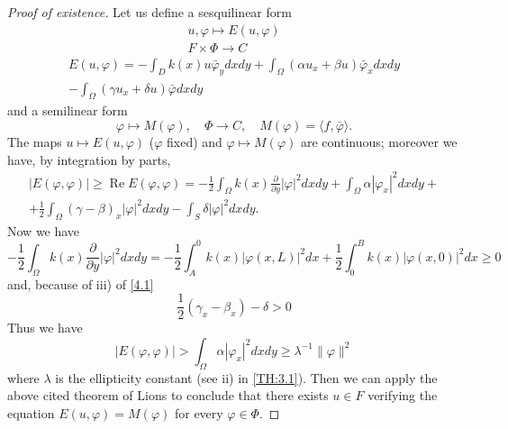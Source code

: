\documentclass[a4paper,12pt,leqno]{article}
\numberwithin{equation}{section}
\begin{document}
\begin{proof}[Proof of existence]
	Let us define a sesquilinear form
	\begin{equation*}
		\begin{gathered}
			u, \varphi \mapsto E(u, \varphi) \\
			F \times \Phi \to C
		\end{gathered}
	\end{equation*}
	\begin{equation} \label{4.8}
		\begin{split}
			E(u, \varphi)=-\int_{D} k(x) u \bar{\varphi}_{y} d x d y+\int_{\Omega}\left(\alpha u_{x}+\beta u\right) \bar{\varphi}_{x} d x d y \\
			-\int_{\Omega}\left(\gamma u_{x}+\delta u\right) \bar{\varphi} d x d y
		\end{split}
	\end{equation}
	and a semilinear form
	\begin{equation*}
		\varphi \mapsto M(\varphi), \quad \Phi \to C, \quad M(\varphi)=\langle f, \bar{\varphi}\rangle.
	\end{equation*}
	The maps $u \mapsto E(u, \varphi)$ ($\varphi$ fixed) and $\varphi \mapsto M(\varphi)$ are continuous; moreover we have, by integration by parts,
	\begin{equation*}
		\begin{split}
			|E(\varphi, \varphi)| \geqslant \operatorname{Re} E(\varphi, \varphi)=-\frac{1}{2} \int_{\Omega} k(x) \frac{\partial}{\partial y}|\varphi|^{2} d x d y+\int_{\Omega} \alpha\left|\varphi_{x}\right|^{2} d x d y+ \\
			+\frac{1}{2} \int_{\Omega}(\gamma-\beta)_{x}|\varphi|^{2} d x d y-\int_{S} \delta|\varphi|^{2} d x d y .
		\end{split}
	\end{equation*}
	Now we have
	\begin{equation*}
		-\frac{1}{2} \int_{\Omega} k(x) \frac{\partial}{\partial y}|\varphi|^{2} d x d y
		=-\frac{1}{2} \int_{A}^{0} k(x)|\varphi(x, L)|^{2} d x+\frac{1}{2} \int_{0}^{B} k(x)|\varphi(x, 0)|^{2} d x \geqslant 0
	\end{equation*}
	and, because of iii) of \eqref{4.1}
	\begin{equation*}
		\frac{1}{2}\left(\gamma_{x}-\beta_{x}\right)-\delta>0
	\end{equation*}
	Thus we have
	\begin{equation*}
		|E(\varphi, \varphi)|>\int_{\Omega} \alpha\left|\varphi_{x}\right|^{2} d x d y\geqslant\lambda^{-1}\|\varphi\|^{2}
	\end{equation*}
	where $\lambda$ is the ellipticity constant (see ii) in \cref{TH:3.1}). 
	Then we can apply the above cited theorem of Lions to conclude that there exists $u \in F$ verifying the equation $E(u, \varphi)=M(\varphi)$ for every $\varphi \in \Phi$.
\end{proof}
\end{document}

